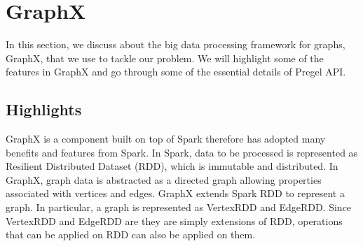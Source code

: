 \section{GraphX} \label{sec:framework}
%
In this section, we discuss about the big data processing framework for graphs, GraphX, that we use to tackle our problem.
%
We will highlight some of the features in GraphX and go through some of the essential details of Pregel API.
%
\subsection{Highlights}
%
GraphX is a component built on top of Spark therefore has adopted many benefits and features from Spark.
%
In Spark, data to be processed is represented as Resilient Distributed Dataset (RDD), which is immutable and distributed.
%
In GraphX, graph data is abstracted as a directed graph allowing properties associated with vertices and edges.
%
GraphX extends Spark RDD to represent a graph.
%
In particular, a graph is represented as VertexRDD and EdgeRDD.
%
Since VertexRDD and EdgeRDD are they are simply extensions of RDD, operations that can be applied on RDD can also be applied on them.
%
